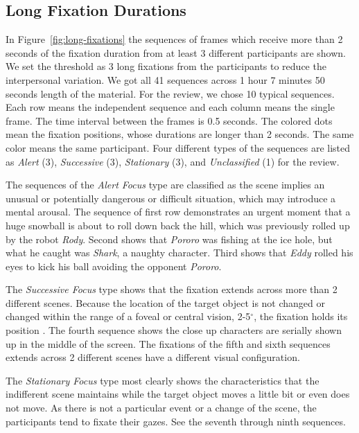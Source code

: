 \documentclass[10pt,letterpaper]{article}
\begin{document}
\subsection{Long Fixation Durations}
\label{subsec:Long-Fixation-Durations}

In Figure~\ref{fig:long-fixations} the sequences of frames which receive more than 2 seconds of the fixation duration from at least 3 different participants are shown. We set the threshold as 3 long fixations from the participants to reduce the interpersonal variation. We got all 41 sequences across 1 hour 7 minutes 50 seconds length of the material. For the review, we chose 10 typical sequences. Each row means the independent sequence and each column means the single frame. The time interval between the frames is 0.5 seconds. The colored dots mean the fixation positions, whose durations are longer than 2 seconds. The same color means the same participant. Four different types of the sequences are listed as \textit{Alert} (3), \textit{Successive} (3), \textit{Stationary} (3), and \textit{Unclassified} (1) for the review.

The sequences of the \textit{Alert Focus} type are classified as the scene implies an unusual or potentially dangerous or difficult situation, which may introduce a mental arousal. The sequence of first row demonstrates an urgent moment that a huge snowball is about to roll down back the hill, which was previously rolled up by the robot \textit{Rody}. Second shows that \textit{Pororo} was fishing at the ice hole, but what he caught was \textit{Shark}, a naughty character. Third shows that \textit{Eddy} rolled his eyes to kick his ball avoiding the opponent \textit{Pororo}.

The \textit{Successive Focus} type shows that the fixation extends across more than 2 different scenes. Because the location of the target object is not changed or changed within the range of a foveal or central vision, 2-5$^{\circ}$, the fixation holds its position \cite{mcmorris2014acquisition}. The fourth sequence shows the close up characters are serially shown up in the middle of the screen. The fixations of the fifth and sixth sequences extends across 2 different scenes have a different visual configuration.

The \textit{Stationary Focus} type most clearly shows the characteristics that the indifferent scene maintains while the target object moves a little bit or even does not move. As there is not a particular event or a change of the scene, the participants tend to fixate their gazes. See the seventh through ninth sequences.
\end{document}
